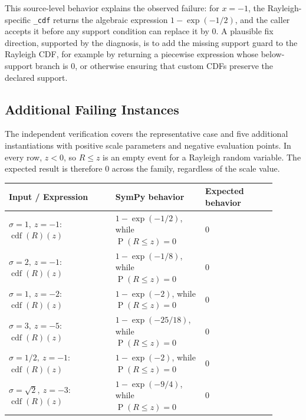 \documentclass[11pt]{article}
\begin{document}
This source-level behavior explains the observed failure: for \(x=-1\), the
Rayleigh-specific \texttt{\_cdf} returns the algebraic expression
\(1-\exp(-1/2)\), and the caller accepts it before any support condition can
replace it by \(0\).  A plausible fix direction, supported by the diagnosis, is
to add the missing support guard to the Rayleigh CDF, for example by returning a
piecewise expression whose below-support branch is \(0\), or otherwise ensuring
that custom CDFs preserve the declared support.

\subsection{Additional Failing Instances}

The independent verification covers the representative case and five additional
instantiations with positive scale parameters and negative evaluation points.
In every row, \(z<0\), so \(R\leq z\) is an empty event for a Rayleigh random
variable.  The expected result is therefore \(0\) across the family, regardless
of the scale value.

\begin{center}
\small
\renewcommand{\arraystretch}{1.3}
\begin{tabular}{@{}>{\raggedright\arraybackslash}p{0.36\linewidth}>{\raggedright\arraybackslash}p{0.30\linewidth}>{\raggedright\arraybackslash}p{0.24\linewidth}@{}}
\toprule
\textbf{Input / Expression} & \textbf{SymPy behavior} & \textbf{Expected behavior} \\
\midrule
\(\sigma=1,\ z=-1\): \(\operatorname{cdf}(R)(z)\) &
\(1-\exp(-1/2)\), while \(\operatorname{P}(R\leq z)=0\) &
\(0\) \\
\(\sigma=2,\ z=-1\): \(\operatorname{cdf}(R)(z)\) &
\(1-\exp(-1/8)\), while \(\operatorname{P}(R\leq z)=0\) &
\(0\) \\
\(\sigma=1,\ z=-2\): \(\operatorname{cdf}(R)(z)\) &
\(1-\exp(-2)\), while \(\operatorname{P}(R\leq z)=0\) &
\(0\) \\
\(\sigma=3,\ z=-5\): \(\operatorname{cdf}(R)(z)\) &
\(1-\exp(-25/18)\), while \(\operatorname{P}(R\leq z)=0\) &
\(0\) \\
\(\sigma=1/2,\ z=-1\): \(\operatorname{cdf}(R)(z)\) &
\(1-\exp(-2)\), while \(\operatorname{P}(R\leq z)=0\) &
\(0\) \\
\(\sigma=\sqrt{2},\ z=-3\): \(\operatorname{cdf}(R)(z)\) &
\(1-\exp(-9/4)\), while \(\operatorname{P}(R\leq z)=0\) &
\(0\) \\
\bottomrule
\end{tabular}
\end{center}
\end{document}
